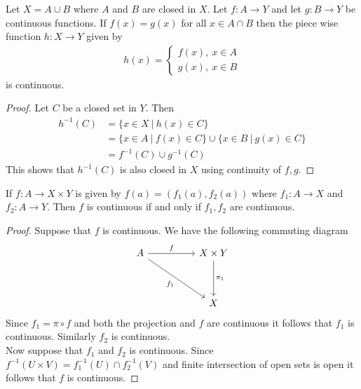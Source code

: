 \begin{theorem}
  Let $X = A\cup B$ where $A$ and $B$ are closed in $X$. Let $f:A\to Y$ and let $g:B\to Y$ be continuous functions. If $f(x) = g(x)$ for all $x\in A\cap B$ then the piece wise function $h:X\to Y$ given by
  \begin{align*}
    h(x) = \begin{cases}
      f(x),\ x\in A\\
      g(x),\ x\in B
    \end{cases}
  \end{align*}
  is continuous.
\end{theorem}
\begin{proof}
  Let $C$ be a closed set in $Y$. Then
  \begin{align*}
    h^{-1}(C) &= \{x\in X\ |\ h(x)\in C\}\\
           &= \{x\in A\ |\ f(x)\in C\} \cup \{x\in B\ |\ g(x)\in C\}\\
           &= f^{-1}(C) \cup g^{-1}(C)
  \end{align*}
  This shows that $h^{-1}(C)$ is also closed in $X$ using continuity of $f,g$.
\end{proof}
\begin{theorem}
  If $f:A\to X\times Y$ is given by $f(a) = (f_1(a), f_2(a))$ where $f_1:A\to X$ and $f_2: A \to Y$. Then $f$ is continuous if and only if $f_1, f_2$ are continuous.
\end{theorem}
\begin{proof}
  Suppose that $f$ is continuous. We have the following commuting diagram
  \[
    \begin{tikzcd}[sep=huge]
      A \arrow{r}{f} \arrow[swap]{dr}{f_1} & X\times Y \arrow{d}{\pi_1} \\ & X
    \end{tikzcd}
  \]
  Since $f_1 = \pi\circ f$ and both the projection and $f$ are continuous it follows that $f_1$ is continuous. Similarly $f_2$ is continuous.\\

  Now suppose that $f_1$ and $f_2$ is continuous. Since $f^{-1}(U\times V) = f_1^{-1}(U)\cap f_2^{-1}(V)$ and finite intersection of open sets is open it follows that $f$ is continuous.
\end{proof}
